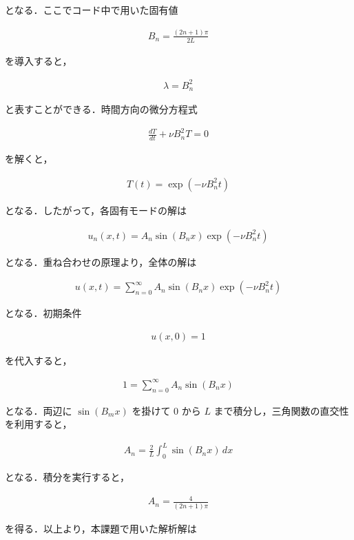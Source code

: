 \documentclass[dvipdfmx]{jsarticle}
\begin{document}
となる．ここでコード中で用いた固有値

\begin{align}
B_n
=
\frac{(2n+1)\pi}{2L}
\end{align}

を導入すると，

\begin{align}
\lambda
=
B_n^2
\end{align}

と表すことができる．時間方向の微分方程式

\begin{align}
\frac{dT}{dt}
+\nu B_n^2T
=
0
\end{align}

を解くと，

\begin{align}
T(t)
=
\exp
\left(
-\nu B_n^2t
\right)
\end{align}

となる．したがって，各固有モードの解は

\begin{align}
u_n(x,t)
=
A_n
\sin(B_nx)
\exp(-\nu B_n^2t)
\end{align}

となる．重ね合わせの原理より，全体の解は

\begin{align}
u(x,t)
=
\sum_{n=0}^{\infty}
A_n
\sin(B_nx)
\exp(-\nu B_n^2t)
\end{align}

となる．初期条件

\begin{align}
u(x,0)=1
\end{align}

を代入すると，

\begin{align}
1
=
\sum_{n=0}^{\infty}
A_n
\sin(B_nx)
\end{align}

となる．両辺に $\sin(B_mx)$ を掛けて $0$ から $L$ まで積分し，三角関数の直交性を利用すると，

\begin{align}
A_n
=
\frac{2}{L}
\int_0^L
\sin(B_nx)\,dx
\end{align}

となる．積分を実行すると，

\begin{align}
A_n
=
\frac{4}{(2n+1)\pi}
\end{align}

を得る．以上より，本課題で用いた解析解は
\end{document}
